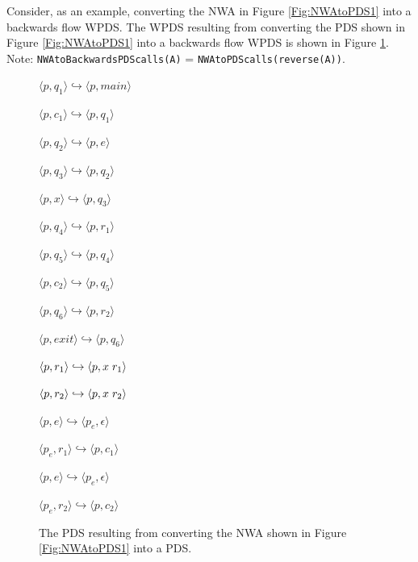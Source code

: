 \noindent Consider, as an example, converting the NWA in Figure
\ref{Fig:NWAtoPDS1} into a backwards flow WPDS.  The WPDS resulting from
converting the PDS shown in Figure \ref{Fig:NWAtoPDS1} into a backwards flow
WPDS is shown in Figure \ref{Fig:NWAtoPDS5}.  Note:
\texttt{NWAtoBackwardsPDScalls(A)} = \texttt{NWAtoPDScalls(reverse(A))}.  \\

\begin{figure}[htbp]
  \centering
    \begin{description}
      \centering
      \item{ $\langle p,q_1 \rangle \hookrightarrow \langle p,main \rangle$}
      \item{ $\langle p,c_1 \rangle \hookrightarrow \langle p,q_1 \rangle$}
      \item{ $\langle p,q_2 \rangle \hookrightarrow \langle p,e \rangle$}
      \item{ $\langle p,q_3 \rangle \hookrightarrow \langle p,q_2 \rangle$}
      \item{ $\langle p,x \rangle \hookrightarrow \langle p,q_3 \rangle$}
      \item{ $\langle p,q_4 \rangle \hookrightarrow \langle p,r_1 \rangle$}
      \item{ $\langle p,q_5 \rangle \hookrightarrow \langle p,q_4 \rangle$}
      \item{ $\langle p,c_2 \rangle \hookrightarrow \langle p,q_5 \rangle$}
      \item{ $\langle p,q_6 \rangle \hookrightarrow \langle p,r_2 \rangle$}
      \item{ $\langle p,exit \rangle \hookrightarrow \langle p,q_6 \rangle$}
      \item{ $\langle p,r_1 \rangle \hookrightarrow \langle p,x \hspace{.1cm} r_1 \rangle$}
      \item{ $\langle p,r_2 \rangle \hookrightarrow \langle p,x \hspace{.1cm} r_2 \rangle$}
      \item{ $\langle p,e \rangle \hookrightarrow \langle p_e, \epsilon \rangle$}
      \item{ $\langle p_e,r_1 \rangle \hookrightarrow \langle p,c_1 \rangle$}
      \item{ $\langle p,e \rangle \hookrightarrow \langle p_e, \epsilon \rangle$}
      \item{ $\langle p_e,r_2 \rangle \hookrightarrow \langle p,c_2 \rangle$}
    \end{description}
  \caption{The PDS resulting from converting the NWA shown in Figure \ref{Fig:NWAtoPDS1} into a PDS.}
  \label{Fig:NWAtoPDS5}
\end{figure}

